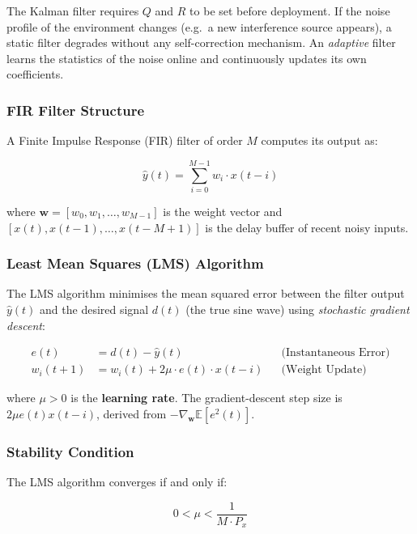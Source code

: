 \documentclass[12pt, a4paper]{article}
\begin{document}
The Kalman filter requires $Q$ and $R$ to be set before deployment. If the noise
profile of the environment changes (e.g.\ a new interference source appears), a
static filter degrades without any self-correction mechanism. An \emph{adaptive}
filter learns the statistics of the noise online and continuously updates its
own coefficients.

\subsubsection{FIR Filter Structure}

A Finite Impulse Response (FIR) filter of order $M$ computes its output as:

\begin{equation}
  \hat{y}(t) = \sum_{i=0}^{M-1} w_i \cdot x(t-i)
  \label{eq:fir}
\end{equation}

where $\mathbf{w} = [w_0, w_1, \ldots, w_{M-1}]$ is the weight vector and
$[x(t), x(t-1), \ldots, x(t-M+1)]$ is the delay buffer of recent noisy inputs.

\subsubsection{Least Mean Squares (LMS) Algorithm}

The LMS algorithm minimises the mean squared error between the filter output
$\hat{y}(t)$ and the desired signal $d(t)$ (the true sine wave) using
\emph{stochastic gradient descent}:

\begin{align}
  e(t)     &= d(t) - \hat{y}(t)                           && \text{(Instantaneous Error)} \\
  w_i(t+1) &= w_i(t) + 2\mu \cdot e(t) \cdot x(t-i)      && \text{(Weight Update)}
  \label{eq:lms}
\end{align}

where $\mu > 0$ is the \textbf{learning rate}. The gradient-descent step size is
$2\mu e(t) x(t-i)$, derived from $-\nabla_{\mathbf{w}} \mathbb{E}[e^2(t)]$.

\subsubsection{Stability Condition}

The LMS algorithm converges if and only if:

\begin{equation}
  0 < \mu < \frac{1}{M \cdot P_x}
\end{equation}
\end{document}

